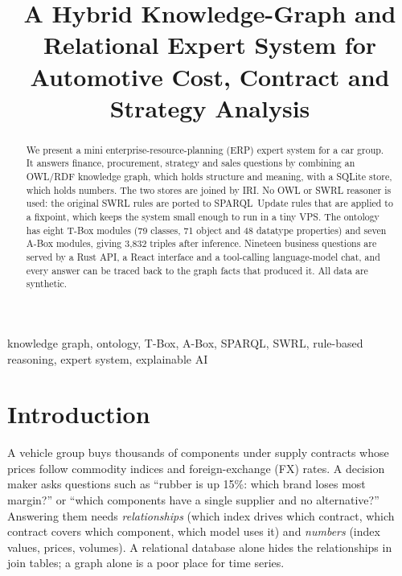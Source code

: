 \documentclass[conference]{IEEEtran}
\begin{document}
\title{A Hybrid Knowledge-Graph and Relational Expert System for Automotive Cost, Contract and Strategy Analysis}

\author{
}

\maketitle

\begin{abstract}
We present a mini enterprise-resource-planning (ERP) expert system for a car group.
It answers finance, procurement, strategy and sales questions by combining an OWL/RDF knowledge graph, which holds structure and meaning, with a SQLite store, which holds numbers.
The two stores are joined by IRI.
No OWL or SWRL reasoner is used: the original SWRL rules are ported to SPARQL~Update rules that are applied to a fixpoint, which keeps the system small enough to run in a tiny VPS.
The ontology has eight T-Box modules (79 classes, 71 object and 48 datatype properties) and seven A-Box modules, giving 3{,}832 triples after inference.
Nineteen business questions are served by a Rust API, a React interface and a tool-calling language-model chat, and every answer can be traced back to the graph facts that produced it.
All data are synthetic.
\end{abstract}

\begin{IEEEkeywords}
knowledge graph, ontology, T-Box, A-Box, SPARQL, SWRL, rule-based reasoning, expert system, explainable AI
\end{IEEEkeywords}

\section{Introduction}
A vehicle group buys thousands of components under supply contracts whose prices follow commodity indices and foreign-exchange (FX) rates.
A decision maker asks questions such as ``rubber is up 15\%: which brand loses most margin?'' or ``which components have a single supplier and no alternative?''
Answering them needs \emph{relationships} (which index drives which contract, which contract covers which component, which model uses it) and \emph{numbers} (index values, prices, volumes).
A relational database alone hides the relationships in join tables; a graph alone is a poor place for time series.
\end{document}
